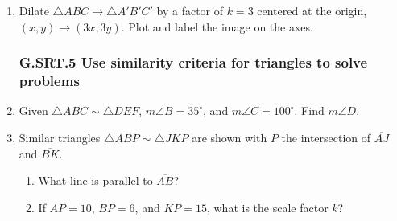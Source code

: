 \documentclass[12pt, twoside]{article}
\begin{document}
\begin{enumerate}[itemsep=0.5cm]
\item Dilate $\triangle ABC \rightarrow \triangle A'B'C'$ by a factor of $k=3$ centered at the origin, \\
$(x,y) \rightarrow (3x, 3y)$. Plot and label the image on the axes.
  \begin{center}
  \end{center}

\newpage
\subsubsection*{G.SRT.5 Use similarity criteria for triangles to solve problems}
\item Given $\triangle ABC \sim \triangle DEF$, $m\angle B=35^\circ$, and $m\angle C=100^\circ$. Find $m\angle D$. \vspace{4cm}


\item Similar triangles $\triangle ABP \sim \triangle JKP$ are shown with $P$ the intersection of $\overline{AJ}$ and $\overline{BK}$.
\begin{multicols}{2}
  \begin{enumerate}
      \item What line is parallel to $\overline{AB}$?
      \item If $AP = 10$, $BP = 6$, and $KP = 15$, what is the scale factor $k$? \vspace{2cm}
      \end{enumerate}
  \end{multicols}
    \vspace{1cm}


\end{enumerate}
\end{document}
